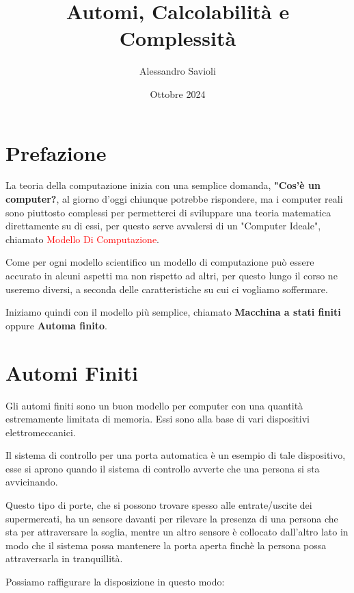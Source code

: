 \documentclass{article}
\begin{document}
\title{Automi, Calcolabilità e Complessità}
\author{Alessandro Savioli}
\date{Ottobre 2024}

\maketitle

\tableofcontents

\newpage

\section{Prefazione}

La teoria della computazione inizia con una semplice domanda, \textbf{"Cos'è un
computer?}, al giorno d'oggi chiunque potrebbe rispondere, ma i computer reali
sono piuttosto complessi per permetterci di sviluppare una teoria matematica
direttamente su di essi, per questo serve avvalersi di un "Computer Ideale",
chiamato \textcolor{red}{Modello Di Computazione}.

Come per ogni modello scientifico un modello di computazione può essere accurato
in alcuni aspetti ma non rispetto ad altri, per questo lungo il corso ne useremo
diversi, a seconda delle caratteristiche su cui ci vogliamo soffermare.

Iniziamo quindi con il modello più semplice, chiamato \textbf{Macchina a stati
finiti} oppure \textbf{Automa finito}.

\section{Automi Finiti}
Gli automi finiti sono un buon modello per computer con una quantità
estremamente limitata di memoria. Essi sono alla base di vari dispositivi
elettromeccanici. 

Il sistema di controllo per una porta automatica è un esempio di tale
dispositivo, esse si aprono quando il sistema di controllo avverte che una
persona si sta avvicinando. 

Questo tipo di porte, che si possono trovare spesso alle entrate/uscite dei
supermercati, ha un sensore davanti per rilevare la presenza di una persona che
sta per attraversare la soglia, mentre un altro sensore è collocato dall'altro
lato in modo che il sistema possa mantenere la porta aperta finchè la persona
possa attraversarla in tranquillità. 

Possiamo raffigurare la disposizione in questo modo: 
\end{document}

